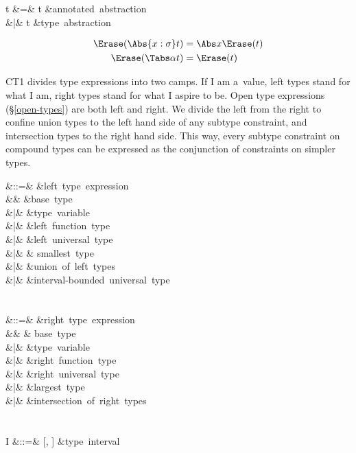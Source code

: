 \documentclass{amsart}
\theoremstyle{definition}
\begin{document}

\begin{syntax}
t &\+=& t &\mbox{annotated abstraction}\\
&|& \Tabs\alpha t &\mbox{type abstraction}
\end{syntax}%

\begin{align*}
\Erase(\Abs{x:\sigma}t) & = \Abs x\Erase(t)\\
\Erase(\Tabs\alpha t) &= \Erase(t)
\end{align*}


CT1 divides type expressions into two camps. If I am a~value,
left types stand for what I am, right types stand for what I
aspire to be. Open type expressions (\S\ref{open-types}) are both
left and right. We divide the left from the right to confine
union types to the left hand side of any subtype constraint, and
intersection types to the right hand side. This way, every
subtype constraint on compound types can be expressed as the
conjunction of constraints on simpler types.

\begin{syntax}
\rho &::=& &\mbox{left type expression}\\
&& \iota &\mbox{base type}\\
&|& \alpha &\mbox{type variable}\\
&|& \tau \R \rho &\mbox{left function type}\\
&|& \All\alpha\rho &\mbox{left universal type}\\
&|& \Bot & \mbox{smallest type}\\
&|& \rho\cup\rho &\mbox{union of left types}\\
&|& \rho &\mbox{interval-bounded universal type}\\
\\\\
\tau &::=& &\mbox{right type expression}\\
&& \iota & \mbox{base type}\\
&|& \alpha &\mbox{type variable}\\
&|& \rho \R \tau &\mbox{right function type}\\
&|& \All\alpha\tau &\mbox{right universal type}\\
&|& \Top &\mbox{largest type}\\
&|& \tau\cap\tau &\mbox{intersection of right types}\\
\\\\
I &::=& [\rho, \tau] &\mbox{type interval}
\end{syntax}%
\end{document}
